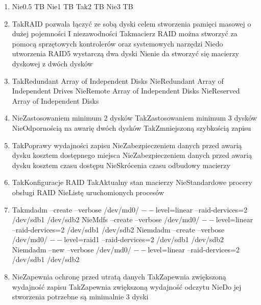 \begin{enumerate}
		\newpage
		\item {}%
		{Nie}{0.5 TB}%
		{Nie}{1 TB}%
		{Tak}{2 TB}%
		{Nie}{3 TB}
		\item {}%
		{Tak}{RAID pozwala łączyć ze sobą dyski celem stworzenia pamięci masowej o dużej pojemności I niezawodności}%
		{Tak}{macierz RAID można stworzyć za pomocą sprzętowych kontrolerów oraz systemowych narzędzi}%
		{Nie}{do utworzenia RAID5 wystarczą dwa dyski}%
		{Nie}{nie da stworzyć się macierzy dyskowej z dwóch dysków}
		\item {}%
		{Tak}{Redundant Array of Independent Disks}%
		{Nie}{Redundant Array of Independent Drives}%
		{Nie}{Remote Array of Independent Disks}%
		{Nie}{Reserved Array of Independent Disks}
		\item {}%
		{Nie}{Zastosowaniem minimum 2 dysków}%
		{Tak}{Zastosowaniem minimum 3 dysków}%
		{Nie}{Odpornością na awarię dwóch dysków}%
		{Tak}{Zmniejszoną szybkością zapisu}
		\item {}%
		{Tak}{Poprawy wydajności zapisu}%
		{Nie}{Zabezpieczeniem danych przed awarią dysku kosztem dostępnego miejsca}%
		{Nie}{Zabezpieczeniem danych przed awarią dysku kosztem czasu dostępu}%
		{Nie}{Skrócenia czasu odbudowy macierzy}
		\item {}%
		{Tak}{Konfiguracje RAID}%
		{Tak}{Aktualny stan macierzy}%
		{Nie}{Standardowe procery obsługi RAID}%
		{Nie}{Listę uruchomionych procesów}
		\item {}%
		{Tak}{mdadm –create –verbose /dev/md0/ $ -- $level=linear –raid-dervices=2 /dev/sdb1 /dev/sdb2}%
		{Nie}{Mdfs –create –verbose /dev/md0/ $ -- $level=linear –raid-dervices=2 /dev/sdb1 /dev/sdb2}%
		{Nie}{mdadm –create –verbose /dev/md0/ $ -- $level=raid1 –raid-dervices=2 /dev/sdb1 /dev/sdb2}%
		{Nie}{mdadm –new –verbose /dev/md0/ $ -- $level=linear –raid-dervices=2 /dev/sdb1 /dev/sdb2}
		\item \question{}%
		{Nie}{Zapewnia ochronę przed utratą danych}%
		{Tak}{Zapewnia zwiększoną wydajność zapisu}%
		{Tak}{Zapewnia zwiększoną wydajność odczytu}%
		{Nie}{Do jej stworzenia potrzebne są minimalnie 3 dyski}
		

\end{enumerate}
